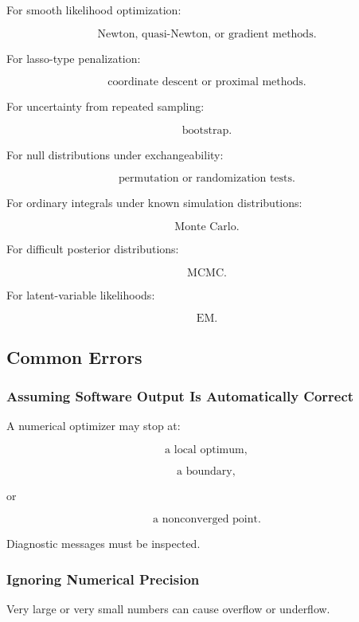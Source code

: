 For smooth likelihood optimization:

\[
\boxed{
\text{Newton, quasi-Newton, or gradient methods}.
}
\]

For lasso-type penalization:

\[
\boxed{
\text{coordinate descent or proximal methods}.
}
\]

For uncertainty from repeated sampling:

\[
\boxed{
\text{bootstrap}.
}
\]

For null distributions under exchangeability:

\[
\boxed{
\text{permutation or randomization tests}.
}
\]

For ordinary integrals under known simulation distributions:

\[
\boxed{
\text{Monte Carlo}.
}
\]

For difficult posterior distributions:

\[
\boxed{
\text{MCMC}.
}
\]

For latent-variable likelihoods:

\[
\boxed{
\text{EM}.
}
\]

\subsection{Common Errors}
\label{subsec:computational-statistics-common-errors}

\subsubsection{Assuming Software Output Is Automatically Correct}

A numerical optimizer may stop at:

\[
\boxed{
\text{a local optimum},
}
\]

\[
\boxed{
\text{a boundary},
}
\]

or

\[
\boxed{
\text{a nonconverged point}.
}
\]

Diagnostic messages must be inspected.

\subsubsection{Ignoring Numerical Precision}

Very large or very small numbers can cause overflow or underflow.

